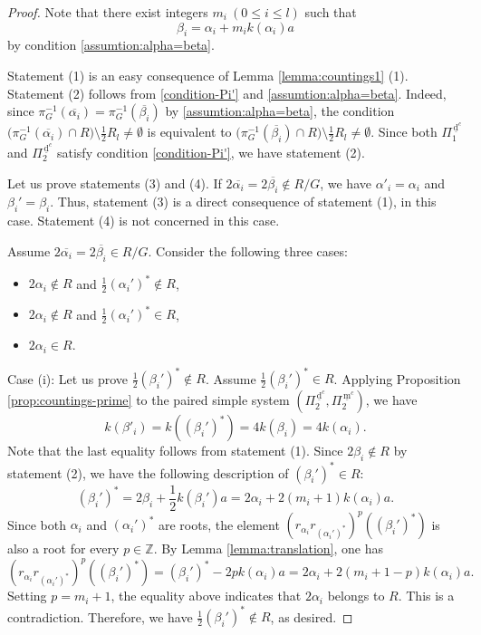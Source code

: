 \documentclass[11pt]{amsart}
\newcommand{\Z}{\mathbb{Z}}
\newcommand{\dc}{\,\underline{\mathrm{d}}^c}
\newcommand{\mc}{\, \underline{\mathrm{m}}^c}
\begin{document}
{\begin{proof}
Note that there exist integers 
$m_i\ (0\leq i\leq l)$ such that
\begin{equation}\label{alpha-beta}
\beta_i=\alpha_i+m_i k(\alpha_i)a
\end{equation}
by condition \eqref{assumtion:alpha=beta}.

 Statement (1) is an easy consequence of  
Lemma \ref{lemma:countings1} (1).
Statement  (2) follows {from} 
\eqref{condition-Pi'} and \eqref{assumtion:alpha=beta}. Indeed, 
since $\pi_G^{-1}(\overline{\alpha_i})=\pi_G^{-1}(\overline{\beta_i})$ by
\eqref{assumtion:alpha=beta}, the
condition $\big(\pi_G^{-1}(\overline{\alpha_i})\cap R\big)\setminus \frac12 R_l\ne \emptyset$ is
equivalent to $\big(\pi_G^{-1}(\overline{\beta_i})\cap R\big)\setminus \frac12 R_l\ne \emptyset$.
Since both $\Pi_1^{\dc}$ and $\Pi_2^{\dc}$ satisfy  condition \eqref{condition-Pi'}, 
we have  statement (2). 

Let us prove statements (3) and (4). 
If $2\overline{\alpha_i}=2\overline{\beta_i}\not\in R/G$, we have 
$\alpha'_i=\alpha_i$ and $\beta_i'=\beta_i$. Thus, statement (3) is a direct
consequence of  statement (1), in this case. 
Statement (4) is not concerned in this case.
 
Assume $2\overline{\alpha_i}=2\overline{\beta_i}\in R/G$. Consider the
following three cases: 
\begin{itemize}
\item[(i)] $2\alpha_i\not\in R$ and $\frac12 (\alpha_i')^\ast \not \in R$, 
\vskip 1mm
\item[(ii)] $2\alpha_i\not\in R$ and $\frac12 (\alpha_i')^\ast \in R$, 
\vskip 1mm
\item[(iii)] $2\alpha_i\in R$. 
\end{itemize}
\vskip 1mm
\noindent
Case (i): Let us prove $\frac12 (\beta_i')^\ast\not\in R$. 
Assume $\frac12 (\beta_i')^\ast\in R$. 
Applying Proposition \ref{prop:countings-prime} to the paired simple system
$(\Pi_2^{\dc},\Pi_2^{\mc})$, we have
\[k(\beta'_i)=k((\beta_i')^\ast)=4k(\beta_i)=4k(\alpha_i).\]
Note that the last equality follows from  statement (1). 
Since $2\beta_i\not\in R$ by statement (2), we have the following description 
of $(\beta_i')^\ast\in R$:
\[(\beta_i')^\ast=2\beta_i+\frac12 k(\beta_i')a=2\alpha_i+2(m_i+1)k(\alpha_i)a.\]
Since both $\alpha_i$ and $(\alpha_i')^\ast$ are roots, the element 
$(r_{\alpha_i}r_{(\alpha_i')^\ast})^p((\beta_i')^\ast)$
is also a root for every $p\in\Z$.
By Lemma \ref{lemma:translation}, one has
\[(r_{\alpha_i}r_{(\alpha_i')^\ast})^p((\beta_i')^\ast)=(\beta_i')^\ast-2pk(\alpha_i)a
=2\alpha_i+2(m_i+1-p)k(\alpha_i)a.\] 
Setting $p=m_i+1$, the equality above indicates that $2\alpha_i$ belongs to $R$. 
This is a contradiction. Therefore, we have $\frac12 (\beta_i')^\ast\not\in R$, 
as desired. 


\end{proof}}
\end{document}

